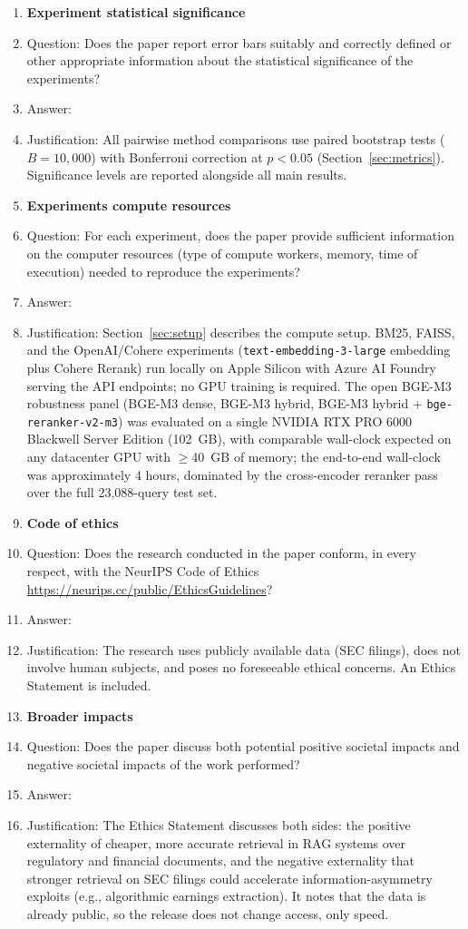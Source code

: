 \begin{enumerate}
\item {\bf Experiment statistical significance}
    \item[] Question: Does the paper report error bars suitably and correctly defined or other appropriate information about the statistical significance of the experiments?
    \item[] Answer: \answerYes{}
    \item[] Justification: All pairwise method comparisons use paired bootstrap tests ($B = 10{,}000$) with Bonferroni correction at $p < 0.05$ (Section~\ref{sec:metrics}). Significance levels are reported alongside all main results.

\item {\bf Experiments compute resources}
    \item[] Question: For each experiment, does the paper provide sufficient information on the computer resources (type of compute workers, memory, time of execution) needed to reproduce the experiments?
    \item[] Answer: \answerYes{}
    \item[] Justification: Section~\ref{sec:setup} describes the compute setup. BM25, FAISS, and the OpenAI/Cohere experiments (\texttt{text-embedding-3-large} embedding plus Cohere Rerank) run locally on Apple Silicon with Azure AI Foundry serving the API endpoints; no GPU training is required. The open BGE-M3 robustness panel (BGE-M3 dense, BGE-M3 hybrid, BGE-M3 hybrid + \texttt{bge-reranker-v2-m3}) was evaluated on a single NVIDIA RTX PRO 6000 Blackwell Server Edition (102~GB), with comparable wall-clock expected on any datacenter GPU with $\geq$40~GB of memory; the end-to-end wall-clock was approximately 4 hours, dominated by the cross-encoder reranker pass over the full 23{,}088-query test set.

\item {\bf Code of ethics}
    \item[] Question: Does the research conducted in the paper conform, in every respect, with the NeurIPS Code of Ethics \url{https://neurips.cc/public/EthicsGuidelines}?
    \item[] Answer: \answerYes{}
    \item[] Justification: The research uses publicly available data (SEC filings), does not involve human subjects, and poses no foreseeable ethical concerns. An Ethics Statement is included.

\item {\bf Broader impacts}
    \item[] Question: Does the paper discuss both potential positive societal impacts and negative societal impacts of the work performed?
    \item[] Answer: \answerYes{}
    \item[] Justification: The Ethics Statement discusses both sides: the positive externality of cheaper, more accurate retrieval in RAG systems over regulatory and financial documents, and the negative externality that stronger retrieval on SEC filings could accelerate information-asymmetry exploits (e.g., algorithmic earnings extraction). It notes that the data is already public, so the release does not change access, only speed.


\end{enumerate}
